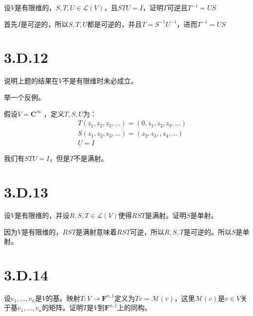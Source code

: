 \documentclass[10pt,a4paper,UTF8]{article}
\begin{document}
\begin{problem}
设\(V\)是有限维的，\(S,T,U\in \mathcal{L}(V)\)，且\(STU=I\)，证明\(T\)可逆且\(T^{-1} = US\)
\end{problem}

\begin{answer}
首先\(I\)是可逆的，所以\(S,T,U\)都是可逆的，并且\(T=S^{-1}U^{-1}\)，进而\(T^{-1} = US\)
\end{answer}
\section{3.D.12}
\label{sec:orgb2624e9}


\begin{problem}
说明上题的结果在\(V\)不是有限维时未必成立。
\end{problem}

\begin{answer}
举一个反例。

假设\(V = \mathbf{C}^{\infty}\) ，定义\(T,S,U\)为：
\begin{eqnarray*}
&&T(z_{1},z_{2},z_{3},\ldots )=(0,z_{1},z_{2},z_{3},\ldots ) \\
&&S(z_{1},z_{2},z_{3},\ldots )=(z_{2},z_{3},,z_{4},\ldots ) \\
&&U =I
\end{eqnarray*}

我们有\(STU = I\)，但是\(T\)不是满射。
\end{answer}
\section{3.D.13}
\label{sec:org06b4d7b}


\begin{problem}
设\(V\)是有限维的，并设\(R,S,T\in \mathcal{L}(V)\)使得\(RST\)是满射。证明\(S\)是单射。
\end{problem}

\begin{answer}
因为\(V\)是有限维的，\(RST\)是满射意味着\(RST\)可逆，所以\(R,S,T\)是可逆的。所以\(S\)是单射。
\end{answer}

\section{3.D.14}
\label{sec:org20864d8}


\begin{problem}
设\(v_{1},\ldots ,v_{n}\)是\(V\)的基。映射\(T:V\rightarrow \mathbf{F}^{n,1}\)定义为\(Tv = \mathcal{M}(v)\)，这里\(\mathcal{M}(v)\)是\(v\in V\)关于基\(v_{1},\ldots ,v_{n}\)的矩阵。证明\(T\)是\(V\)到\(\mathbf{F}^{n,1}\)上的同构。
\end{problem}
\end{document}
